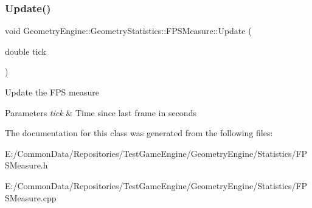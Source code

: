 \subsubsection{\texorpdfstring{Update()}{Update()}}
{\footnotesize\ttfamily void Geometry\+Engine\+::\+Geometry\+Statistics\+::\+F\+P\+S\+Measure\+::\+Update (\begin{DoxyParamCaption}\item[{double}]{tick }\end{DoxyParamCaption})}

Update the F\+PS measure 
\begin{DoxyParams}{Parameters}
{\em tick} & Time since last frame in seconds \\
\hline
\end{DoxyParams}


The documentation for this class was generated from the following files\+:\begin{DoxyCompactItemize}
\item 
E\+:/\+Common\+Data/\+Repositories/\+Test\+Game\+Engine/\+Geometry\+Engine/\+Statistics/F\+P\+S\+Measure.\+h\item 
E\+:/\+Common\+Data/\+Repositories/\+Test\+Game\+Engine/\+Geometry\+Engine/\+Statistics/F\+P\+S\+Measure.\+cpp\end{DoxyCompactItemize}
